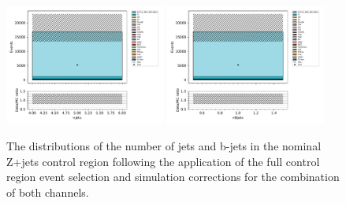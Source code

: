 \begin{figure}[tbp]
\centering
\includegraphics[width=0.47\textwidth]{figs/tzq-fullSelection-plots/plots_ee_zPlus/nJets.pdf}
\includegraphics[width=0.47\textwidth]{figs/tzq-fullSelection-plots/plots_ee_zPlus/nBjets.pdf}
\caption{
The distributions of the number of jets and b-jets in the nominal Z+jets control region following the application of the full control region event selection and simulation corrections for the combination of both channels.
}
\label{fig:zPlusCR_nJets}
\end{figure}

